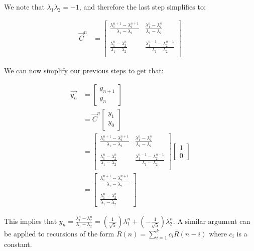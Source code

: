 \documentclass{article}
\begin{document}
We note that $\lambda_{1}\lambda_{2}=-1$, and therefore the last step simplifies to:

\begin{align*}
\vec{C}^{n}
&=
\begin{bmatrix}
\frac{\lambda_{1}^{n+1} - \lambda_{2}^{n+1}}{\lambda_{1}-\lambda_{2}}
& \frac{\lambda_{1}^{n} - \lambda_{2}^{n}}{\lambda_{1}-\lambda_{2}}\\
 & \\
\frac{\lambda_{1}^{n} - \lambda_{2}^{n}}{\lambda_{1}-\lambda_{2}}
& \frac{\lambda_{1}^{n-1} - \lambda_{2}^{n-1}}{\lambda_{1}-\lambda_{2}} \\
\end{bmatrix}
\end{align*}

We can now simplify our previous steps to get that:

\begin{align*}
\vec{y_{n}}
&=
\begin{bmatrix}
y_{n+1} \\
y_{n}
\end{bmatrix}\\
&=
\vec{C}^{n}
\begin{bmatrix}
y_{1} \\
y_{0}
\end{bmatrix}\\
&=
\begin{bmatrix}
\frac{\lambda_{1}^{n+1} - \lambda_{2}^{n+1}}{\lambda_{1}-\lambda_{2}}
& \frac{\lambda_{1}^{n} - \lambda_{2}^{n}}{\lambda_{1}-\lambda_{2}}\\
 & \\
\frac{\lambda_{1}^{n} - \lambda_{2}^{n}}{\lambda_{1}-\lambda_{2}}
& \frac{\lambda_{1}^{n-1} - \lambda_{2}^{n-1}}{\lambda_{1}-\lambda_{2}} \\
\end{bmatrix}
\begin{bmatrix}
1 \\
0
\end{bmatrix}\\
&=
\begin{bmatrix}
\frac{\lambda_{1}^{n+1} - \lambda_{2}^{n+1}}{\lambda_{1}-\lambda_{2}} \\
\\
\frac{\lambda_{1}^{n} - \lambda_{2}^{n}}{\lambda_{1}-\lambda_{2}}
\end{bmatrix}
\end{align*}

This implies that
$y_{n}=\frac{\lambda_{1}^{n} - \lambda_{2}^{n}}{\lambda_{1}-\lambda_{2}}=\left(\frac{1}{\sqrt{5}}\right)\lambda_{1}^{n}+\left(-\frac{1}{\sqrt{5}}\right)\lambda_{2}^{n}$.
A similar argument can be applied to recursions of the form
$R(n)=\sum_{i=1}^{k}c_{i}R(n-i)$ where $c_{i}$ is a constant.
\end{document}
